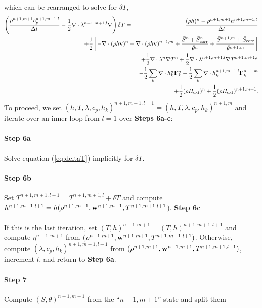\documentclass[final]{siamltex}
\def\Fb {{\bf F}}
\def\vb {{\bf v}}
\def\wb {{\bf w}}
\def\Hext {H_{\rm ext}}
\def\half   {\frac{1}{2}}
\begin{document}
which can be rearranged to solve for $\delta T$,
\begin{eqnarray}
\left(\frac{\rho^{n+1,m+1}c_p^{n+1,m+1,l}}{\Delta t} - \half\nabla\cdot\lambda^{n+1,m+1,l}\nabla\right)\delta T &=& \frac{(\rho h)^n - \rho^{n+1,m+1}h^{n+1,m+1,l}}{\Delta t}\nonumber\\
&&\hspace{-1.25in} + \half\left[-\nabla\cdot(\rho h\vb)^n - \nabla\cdot(\rho h\vb)^{n+1,m} + \frac{\bar{S}^n + \bar{S}_{\rm corr}^n}{\bar{\theta}^n} + \frac{\bar{S}^{n+1,m} + \bar{S}_{\rm corr}}{\bar{\theta}^{n+1,m}}\right]\nonumber\\
&&\hspace{-1.25in} + \half\nabla\cdot\lambda^n\nabla T^n + \half\nabla\cdot\lambda^{n+1,m+1,l}\nabla T^{n+1,m+1,l}\nonumber\\
&&\hspace{-1.25in} - \half\sum_k\nabla\cdot h_k^n \Fb_k^n - \half\sum_k\nabla\cdot h_k^{n+1,m+1,l} \Fb_k^{n+1,m}\nonumber\\
&&\hspace{-1.25in} + \half(\rho\Hext)^n + \half(\rho\Hext)^{n+1,m+1}.\label{eq:deltaT}
\end{eqnarray}
To proceed, we set $(h,T,\lambda,c_p,h_k)^{n+1,m+1,l=1} = (h,T,\lambda,c_p,h_k)^{n+1,m}$
and iterate over an inner loop from $l=1$ over {\bf Steps 6a-c}:\\ \\
{\bf Step 6a}\\ \\
Solve equation (\ref{eq:deltaT}) implicitly for $\delta T$.\\ \\
{\bf Step 6b}\\ \\
Set $T^{n+1,m+1,l+1} = T^{n+1,m+1,l} + \delta T$ and compute 
$h^{n+1,m+1,l+1} = h(\rho^{n+1,m+1},\wb^{n+1,m+1},T^{n+1,m+1,l+1}$).
{\bf Step 6c}\\ \\
If this is the last iteration, set $(T,h)^{n+1,m+1} = (T,h)^{n+1,m+1,l+1}$
and compute $\eta^{n+1,m+1}$ from $(\rho^{n+1,m+1},\wb^{n+1,m+1},T^{n+1,m+1,l+1})$.
Otherwise,
compute $(\lambda,c_p,h_k)^{n+1,m+1,l+1}$ from 
$(\rho^{n+1,m+1},\wb^{n+1,m+1},T^{n+1,m+1,l+1})$,
increment $l$, and return to {\bf Step 6a}.\\ \\
{\bf Step 7}\\ \\
Compute $(S,\theta)^{n+1,m+1}$ from the ``$n+1,m+1$'' state and split them 
\end{document}
